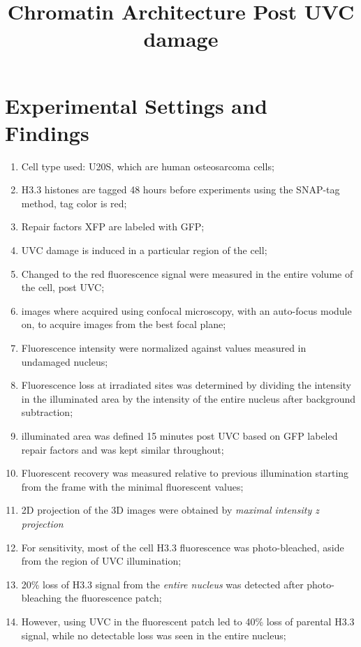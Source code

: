 \documentclass[12pt]{report}
\begin{document}
	
	\title{Chromatin Architecture Post UVC damage}
	\maketitle
	\section{Experimental Settings and Findings}
	\begin{enumerate}
		\item Cell type used: U20S, which are human osteosarcoma cells;
		\item H3.3 histones are tagged 48 hours before experiments using the SNAP-tag method, tag color is red;
		\item Repair factors XFP are labeled with GFP;
		\item UVC damage is induced in a particular region of the cell;
		\item Changed to the red fluorescence signal were measured in the entire volume of the cell, post UVC;
		\item images where acquired using confocal microscopy, with an auto-focus module on, to acquire images from the best focal plane;
		\item Fluorescence intensity were normalized against values measured in undamaged nucleus;
		\item Fluorescence loss at irradiated sites was determined by dividing the intensity in the illuminated area by the intensity of the entire nucleus after background subtraction;
		\item illuminated area was defined 15 minutes post UVC based on GFP labeled repair factors and was kept similar throughout;
		\item Fluorescent recovery was measured relative to previous illumination starting from the frame with the minimal fluorescent values;
		\item 2D projection of the 3D images were obtained by \textit{maximal intensity z projection}
		\item For sensitivity, most of the cell H3.3 fluorescence was photo-bleached, aside from the region of UVC illumination;
		\item 20\% loss of H3.3 signal from the \textit{entire nucleus} was detected after photo-bleaching the fluorescence patch;
		\item However, using UVC in the fluorescent patch led to 40\% loss of parental H3.3 signal, while no detectable loss was seen in the entire nucleus;		

\end{enumerate}
\end{document}
